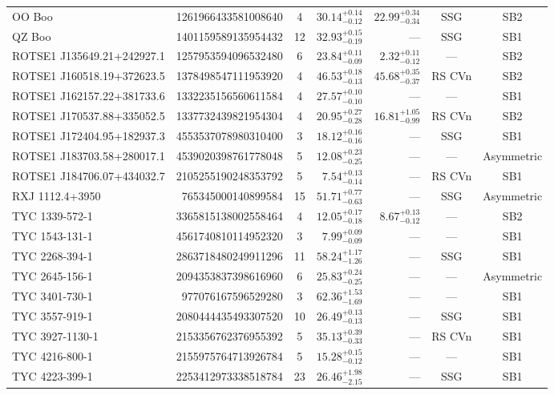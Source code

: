 \begin{table}[htbp]
\begin{minipage}{\textwidth}
\begin{tabular}{lrcrrcc}
 OO Boo & 1261966433581008640 & 4 & $30.14^{+0.14}_{-0.12}$ & $22.99^{+0.34}_{-0.34}$ & SSG & SB2 \\
 QZ Boo & 1401159589135954432 & 12 & $32.93^{+0.15}_{-0.19}$ & --- & SSG & SB1 \\
 ROTSE1 J135649.21+242927.1 & 1257953594096532480 & 6 & $23.84^{+0.11}_{-0.09}$ & $2.32^{+0.11}_{-0.12}$ & --- & SB2 \\
 ROTSE1 J160518.19+372623.5 & 1378498547111953920 & 4 & $46.53^{+0.18}_{-0.13}$ & $45.68^{+0.35}_{-0.37}$ & RS CVn & SB2 \\
 ROTSE1 J162157.22+381733.6 & 1332235156560611584 & 4 & $27.57^{+0.10}_{-0.10}$ & --- & --- & SB1 \\
 ROTSE1 J170537.88+335052.5 & 1337732439821954304 & 4 & $20.95^{+0.27}_{-0.28}$ & $16.81^{+1.05}_{-0.99}$ & RS CVn & SB2 \\
 ROTSE1 J172404.95+182937.3 & 4553537078980310400 & 3 & $18.12^{+0.16}_{-0.16}$ & --- & SSG & SB1 \\
 ROTSE1 J183703.58+280017.1 & 4539020398761778048 & 5 & $12.08^{+0.23}_{-0.25}$ & --- & --- & Asymmetric \\
 ROTSE1 J184706.07+434032.7 & 2105255190248353792 & 5 & $7.54^{+0.13}_{-0.14}$ & --- & RS CVn & SB1 \\
 RXJ 1112.4+3950 & 765345000140899584 & 15 & $51.71^{+0.77}_{-0.63}$ & --- & SSG & Asymmetric \\
 TYC 1339-572-1 & 3365815138002558464 & 4 & $12.05^{+0.17}_{-0.18}$ & $8.67^{+0.13}_{-0.12}$ & --- & SB2 \\
 TYC 1543-131-1 & 4561740810114952320 & 3 & $7.99^{+0.09}_{-0.09}$ & --- & --- & SB1 \\
 TYC 2268-394-1 & 2863718480249911296 & 11 & $58.24^{+1.17}_{-1.26}$ & --- & SSG & SB1 \\
 TYC 2645-156-1 & 2094353837398616960 & 6 & $25.83^{+0.24}_{-0.25}$ & --- & --- & Asymmetric \\
 TYC 3401-730-1 & 977076167596529280 & 3 & $62.36^{+1.53}_{-1.69}$ & --- & --- & SB1 \\
 TYC 3557-919-1 & 2080444435493307520 & 10 & $26.49^{+0.13}_{-0.13}$ & --- & SSG & SB1 \\
 TYC 3927-1130-1 & 2153356762376955392 & 5 & $35.13^{+0.39}_{-0.33}$ & --- & RS CVn & SB1 \\
 TYC 4216-800-1 & 2155975764713926784 & 5 & $15.28^{+0.15}_{-0.12}$ & --- & --- & SB1 \\
 TYC 4223-399-1 & 2253412973338518784 & 23 & $26.46^{+1.98}_{-2.15}$ & --- & SSG & SB1 \\

\end{tabular}
\end{minipage}
\end{table}
